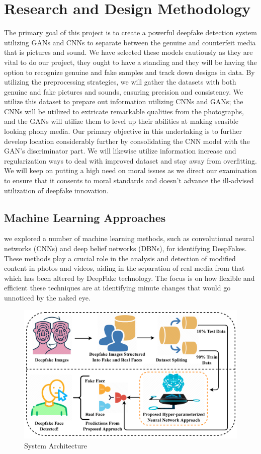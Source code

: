 \documentclass[12pt]{extarticle}
\begin{document}
\section{Research and Design Methodology}
The primary goal of this project is to create a powerful deepfake detection system utilizing GANs and CNNs to separate between the genuine and counterfeit media that is pictures and sound. We have selected these models cautiously as they are vital to do our project, they ought to have a standing and they will be having the option to recognize genuine and fake samples and track down designs in data. By utilizing the preprocessing strategies, we will gather the datasets with both genuine and fake pictures and sounds, ensuring precision and consistency. We utilize this dataset to prepare out information utilizing CNNs and GANs; the CNNs will be utilized to extricate remarkable qualities from the photographs, and the GANs will utilize them to level up their abilities at making sensible looking phony media. Our primary objective in this undertaking is to further develop location considerably further by consolidating the CNN model with the GAN's discriminator part. We will likewise utilize information increase and regularization ways to deal with improved dataset and stay away from overfitting. We will keep on putting a high need on moral issues as we direct our examination to ensure that it consents to moral standards and doesn't advance the ill-advised utilization of deepfake innovation.

\subsection{Machine Learning Approaches}
we explored a number of machine learning methods, such as convolutional neural networks (CNNs) and deep belief networks (DBNs), for identifying DeepFakes. These methods play a crucial role in the analysis and detection of modified content in photos and videos, aiding in the separation of real media from that which has been altered by DeepFake technology. The focus is on how flexible and efficient these techniques are at identifying minute changes that would go unnoticed by the naked eye.

\begin{figure}[htp]
    \centering
    \includegraphics[width=13cm]{Picture1.png}
    \caption{System Architecture}
    \label{fig:galaxy}
\end{figure}
\end{document}

